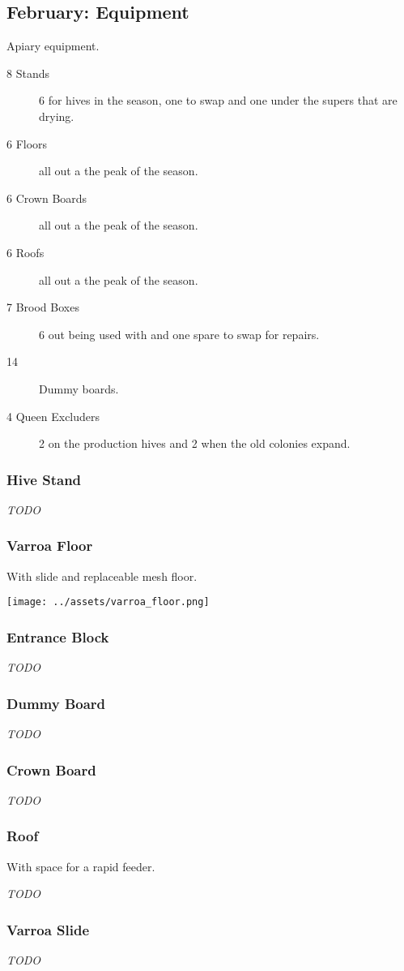 \subsection{February: Equipment}

Apiary equipment.

\begin{description}
    \item[8 Stands] 6 for hives in the season, one to swap and one under the supers that are drying.
    \item[6 Floors] all out a the peak of the season.
    \item[6 Crown Boards] all out a the peak of the season.
    \item[6 Roofs] all out a the peak of the season.
    \item[7 Brood Boxes] 6 out being used with and one spare to swap for repairs.
    \item[14] Dummy boards.

    \item[4 Queen Excluders] 2 on the production hives and 2 when the old colonies expand.
\end{description}

\subsubsection{Hive Stand}

\emph{TODO}

\subsubsection{Varroa Floor}

With slide and replaceable mesh floor.

\texttt{[image: ../assets/varroa\_floor.png]}

\subsubsection{Entrance Block}

\emph{TODO}

\subsubsection{Dummy Board}

\emph{TODO}

\subsubsection{Crown Board}

\emph{TODO}

\subsubsection{Roof}

With space for a rapid feeder.

\emph{TODO}

\subsubsection{Varroa Slide}

\emph{TODO}

